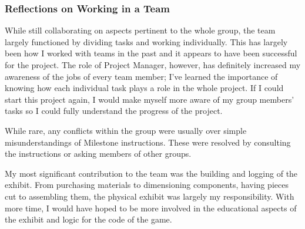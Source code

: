 \documentclass[conference]{IEEEtran}
\begin{document}
\subsubsection{Reflections on Working in a Team}

\par While still collaborating on aspects pertinent to the whole group, the team largely functioned by dividing tasks and working individually.  This has largely been how I worked with teams in the past and it appears to have been successful for the project.  The role of Project Manager, however, has definitely increased my awareness of the jobs of every team member; I’ve learned the importance of knowing how each individual task plays a role in the whole project.  If I could start this project again, I would make myself more aware of my group members’ tasks so I could fully understand the progress of the project.
 \par   While rare, any conflicts within the group were usually over simple misunderstandings of Milestone instructions.  These were resolved by consulting the instructions or asking members of other groups.  
 \par   My most significant contribution to the team was the building and logging of the exhibit.  From purchasing materials to dimensioning components, having pieces cut to assembling them, the physical exhibit was largely my responsibility.  With more time, I would have hoped to be more involved in the educational aspects of the exhibit and logic for the code of the game.

\onecolumn
\end{document}
